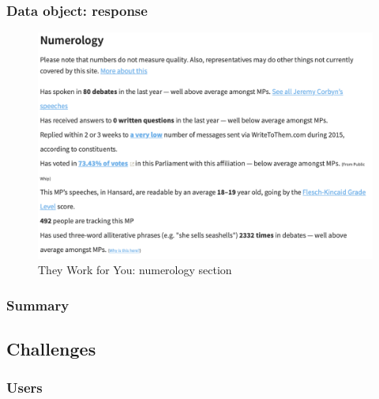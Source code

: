 \documentclass{article}
\begin{document}
        	\subsubsection*{Data object: response}
        	

			\begin{figure}
				\centering
				\includegraphics[scale=0.5]{images/they-work-for-you-numerology}
				\caption{They Work for You: numerology section}
				\label{fig:they-work-for-you-numerology}
			\end{figure}

        	\subsubsection*{Summary}
        	
        	        	        	        	        	                	        	          	     	
        \subsection*{Challenges}
        
        	\subsubsection*{Users}
        	    
\end{document}
